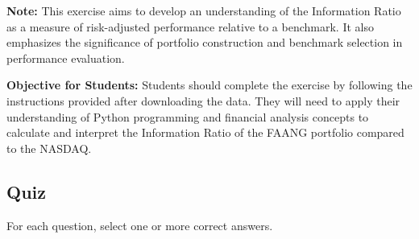 \documentclass{article}
\begin{document}
\begin{enumerate}
    \textbf{Note:} This exercise aims to develop an understanding of the Information Ratio as a measure of risk-adjusted performance relative to a benchmark. It also emphasizes the significance of portfolio construction and benchmark selection in performance evaluation.
\end{enumerate}

\textbf{Objective for Students:} Students should complete the exercise by following the instructions provided after downloading the data. They will need to apply their understanding of Python programming and financial analysis concepts to calculate and interpret the Information Ratio of the FAANG portfolio compared to the NASDAQ.

\subsection{Quiz}
For each question, select one or more correct answers.
\end{document}
